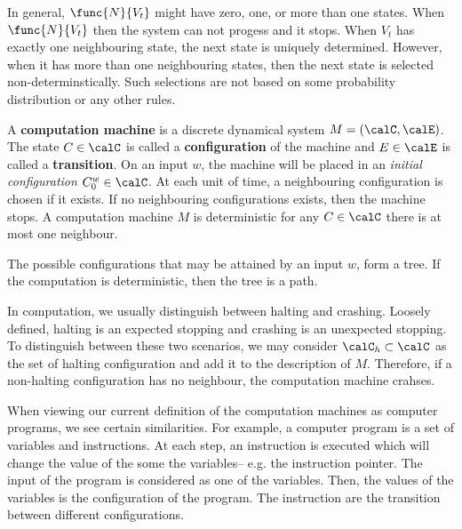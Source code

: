 \begin{remark}
    In general, \(\func{N}{V_t}\) might have zero, one, or more than one states. When \(\func{N}{V_t}\) then the system can not progess and it stops. When \(V_t\) has exactly one neighbouring state, the next state is uniquely determined. However, when it has more than one neighbouring states, then the next state is selected non-determinstically. Such selections are not based on some probability distribution or any other rules. 
\end{remark}

\begin{definition}
    A \textbf{computation machine} is a discrete dynamical system \(M = (\calC,\calE)\). The state \(C \in \calC\) is called a \textbf{configuration} of the machine and \(E \in \calE\) is called a \textbf{transition}. On an input \(w\), the machine will be placed in an \textit{initial configuration} \(C_0^w \in \calC\). At each unit of time, a neighbouring configuration is chosen if it exists. If no neighbouring configurations exists, then the machine stops. A computation machine \(M\) is deterministic for any \(C \in \calC\) there is at most one neighbour.
\end{definition}

The possible configurations that may be attained by an input \(w\), form a tree. If the computation is deterministic, then the tree is a path. 

\begin{remark}
    In computation, we usually distinguish between halting and crashing. Loosely defined, halting is an expected stopping and crashing is an unexpected stopping. To distinguish between these two scenarios, we may consider \(\calC_h \subset \calC\) as the set of halting configuration and add it to the description of \(M\). Therefore, if a non-halting configuration has no neighbour, the computation machine crahses.
\end{remark}

When viewing our current definition of the computation machines as computer programs, we see certain similarities. For example, a computer program is a set of variables and instructions. At each step, an instruction is executed which will change the value of the some the variables-- e.g. the instruction pointer. The input of the program is considered as one of the variables. Then, the values of the variables is the configuration of the program. The instruction are the transition between different configurations.


